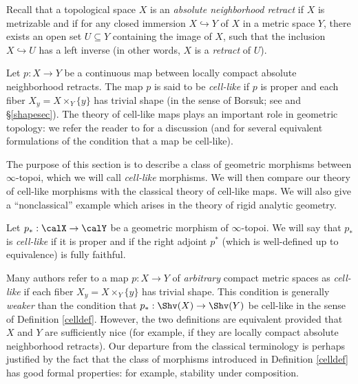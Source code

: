 Recall that a topological space $X$ is an {\it absolute neighborhood retract} if $X$ is
metrizable and if for any closed immersion $X \hookrightarrow Y$ of $X$ in a metric space $Y$, there exists an open set $U \subseteq Y$ containing the image of $X$, such that the inclusion
$X \hookrightarrow U$ has a left inverse (in other words, $X$ is a {\em retract} of $U$).

Let $p: X \rightarrow Y$ be a continuous map between locally compact absolute neighborhood retracts. The map $p$ is said to be {\it cell-like} if $p$ is proper and each fiber $X_{y} = X \times_{Y} \{y\}$ has trivial shape (in the sense of Borsuk; see \cite{shapetheory} and \S \ref{shapesec}). The theory of cell-like maps plays an important role in geometric topology: we refer the reader to \cite{cellmap} for a discussion (and for several equivalent formulations of the condition that a map be cell-like).

The purpose of this section is to describe a class of geometric morphisms between $\infty$-topoi, which we will call {\it cell-like} morphisms. We will then compare our theory of cell-like morphisms with the classical theory of cell-like maps. We will also give a ``nonclassical'' example which arises in the theory of rigid analytic geometry.

\begin{definition}\label{celldef}
Let $p_{\ast}: \calX \rightarrow \calY$ be a geometric morphism of $\infty$-topoi. We will say that
$p_{\ast}$ is {\it cell-like} if it is proper and if the right adjoint $p^{\ast}$ (which is well-defined up to equivalence) is fully faithful.
\end{definition}

\begin{warning}
Many authors refer to a map $p: X \rightarrow Y$ of {\em arbitrary} compact metric spaces
as {\it cell-like} if each fiber $X_{y} = X \times_{Y} \{y\}$ has trivial shape. This condition
is generally {\em weaker} than the condition that $p_{\ast}: \Shv(X) \rightarrow \Shv(Y)$ be cell-like in the sense of Definition \ref{celldef}. However, the two definitions are equivalent provided that $X$ and $Y$ are sufficiently nice (for example, if they are locally compact absolute neighborhood retracts). Our departure from the classical terminology is perhaps justified by the 
fact that the class of morphisms introduced in Definition \ref{celldef} has good formal properties: for example, stability under composition.
\end{warning}


